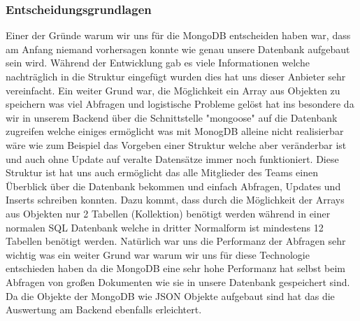 		\subsubsection{Entscheidungsgrundlagen}
			Einer der Gründe warum wir uns für die MongoDB entscheiden haben war, dass am Anfang niemand vorhersagen konnte wie genau unsere Datenbank aufgebaut sein wird. Während der Entwicklung gab es viele Informationen welche nachträglich in die Struktur eingefügt wurden dies hat uns dieser Anbieter sehr vereinfacht. Ein weiter Grund war, die Möglichkeit ein Array aus Objekten zu speichern was viel Abfragen und logistische Probleme gelöst hat ins besondere da wir in unserem Backend über die Schnittstelle "mongoose" auf die Datenbank zugreifen welche einiges ermöglicht was mit MonogDB alleine nicht realisierbar wäre wie zum Beispiel das Vorgeben einer Struktur welche aber veränderbar ist und auch ohne Update auf veralte Datensätze immer noch funktioniert. Diese Struktur ist hat uns auch ermöglicht das alle Mitglieder des Teams einen Überblick über die Datenbank bekommen und einfach Abfragen, Updates und Inserts schreiben konnten. Dazu kommt, dass durch die Möglichkeit der Arrays aus Objekten nur 2 Tabellen (Kollektion) benötigt werden während in einer normalen SQL Datenbank welche in dritter Normalform ist mindestens 12 Tabellen benötigt werden. Natürlich war uns die Performanz der Abfragen sehr wichtig was ein weiter Grund war warum wir uns für diese Technologie entschieden haben da die MongoDB eine sehr hohe Performanz hat selbst beim Abfragen von großen Dokumenten wie sie in unsere Datenbank gespeichert sind. Da die Objekte der MongoDB wie JSON Objekte aufgebaut sind hat das die Auswertung am Backend ebenfalls erleichtert.

\newpage